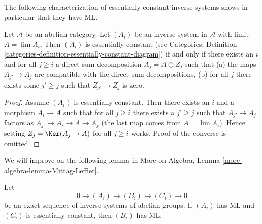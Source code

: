 \noindent
The following characterization of essentially constant inverse systems
shows in particular that they have ML.

\begin{lemma}
\label{lemma-essentially-constant}
Let $\mathcal{A}$ be an abelian category.
Let $(A_i)$ be an inverse system in $\mathcal{A}$ with limit $A = \lim A_i$.
Then $(A_i)$ is essentially constant (see
Categories, Definition
\ref{categories-definition-essentially-constant-diagram})
if and only if there exists an $i$ and for all $j \geq i$ a direct sum
decomposition $A_j = A \oplus Z_j$ such that
(a) the maps $A_{j'} \to A_j$ are compatible with the direct sum
decompositions, (b) for all $j$ there exists some $j' \geq j$ such that
$Z_{j'} \to Z_j$ is zero.
\end{lemma}

\begin{proof}
Assume $(A_i)$ is essentially constant. Then there exists an $i$ and
a morphism $A_i \to A$ such that for all $j \geq i$ there exists
a $j' \geq j$ such that $A_{j'} \to A_j$ factors as
$A_{j'} \to A_i \to A \to A_j$ (the last map comes from $A = \lim A_i$).
Hence setting $Z_j = \Ker(A_j \to A)$ for all $j \geq i$ works.
Proof of the converse is omitted.
\end{proof}

\noindent
We will improve on the following lemma in
More on Algebra, Lemma \ref{more-algebra-lemma-Mittag-Leffler}.

\begin{lemma}
\label{lemma-exact-sequence-ML}
Let
$$
0 \to (A_i) \to (B_i) \to (C_i) \to 0
$$
be an exact sequence of inverse systems of abelian groups.
If $(A_i)$ has ML and $(C_i)$ is essentially constant, then $(B_i)$ has ML.
\end{lemma}

